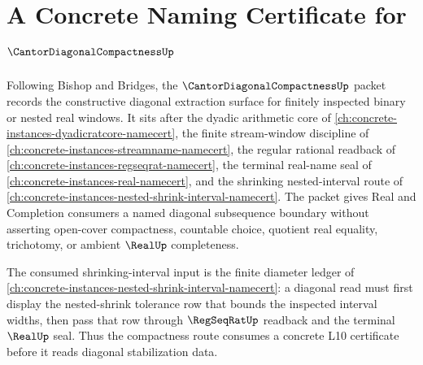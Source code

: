 \chapter{A Concrete Naming Certificate for $\CantorDiagonalCompactnessUp$}
\label{ch:concrete-instances-cantor-diagonal-compactness-namecert}

Following Bishop and Bridges, the $\CantorDiagonalCompactnessUp$ packet records the constructive diagonal extraction surface for finitely inspected binary or nested real windows. It sits after the dyadic arithmetic core of \autoref{ch:concrete-instances-dyadicratcore-namecert}, the finite stream-window discipline of \autoref{ch:concrete-instances-streamname-namecert}, the regular rational readback of \autoref{ch:concrete-instances-regseqrat-namecert}, the terminal real-name seal of \autoref{ch:concrete-instances-real-namecert}, and the shrinking nested-interval route of \autoref{ch:concrete-instances-nested-shrink-interval-namecert}. The packet gives Real and Completion consumers a named diagonal subsequence boundary without asserting open-cover compactness, countable choice, quotient real equality, trichotomy, or ambient $\RealUp$ completeness.

The consumed shrinking-interval input is the finite diameter ledger of \autoref{ch:concrete-instances-nested-shrink-interval-namecert}: a diagonal read must first display the nested-shrink tolerance row that bounds the inspected interval widths, then pass that row through $\RegSeqRatUp$ readback and the terminal $\RealUp$ seal. Thus the compactness route consumes a concrete L10 certificate before it reads diagonal stabilization data.

